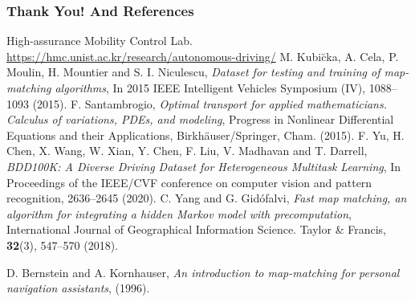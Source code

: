 \documentclass[aspectratio=169, bigfiles, professionalfonts, hyperref={colorlinks=true, allcolors=., urlcolor=blue}]{beamer}
\begin{document}


\begin{frame}[allowframebreaks]
\frametitle{Thank You! And References}

\begin{thebibliography}{9}
\scriptsize{


  High-assurance Mobility Control Lab. \url{https://hmc.unist.ac.kr/research/autonomous-driving/}
 M. Kubi\u cka, A. Cela, P. Moulin, H. Mountier and S. I. Niculescu, \textit{Dataset for testing and training of map-matching algorithms}, In 2015 IEEE Intelligent Vehicles Symposium (IV), 1088--1093 (2015).
 F. Santambrogio, \textit{Optimal transport for applied mathematicians. Calculus of variations, PDEs, and modeling}, Progress in Nonlinear Differential Equations and their Applications, Birkh\"{a}user/Springer, Cham. (2015).
 F. Yu, H. Chen, X. Wang, W. Xian, Y. Chen, F. Liu, V. Madhavan and T. Darrell, \textit{BDD100K: A Diverse Driving Dataset for Heterogeneous Multitask Learning}, In Proceedings of the IEEE/CVF conference on computer vision and pattern recognition, 2636--2645 (2020).
 C. Yang and G. Gid\' ofalvi, \textit{Fast map matching, an algorithm for integrating a hidden Markov model with precomputation}, International Journal of Geographical Information Science. Taylor \& Francis, \textbf{32}(3), 547--570 (2018).}
  D. Bernstein and A. Kornhauser, \textit{An introduction to map-matching for personal navigation assistants}, (1996).
\end{thebibliography}
\end{frame}
\end{document}
